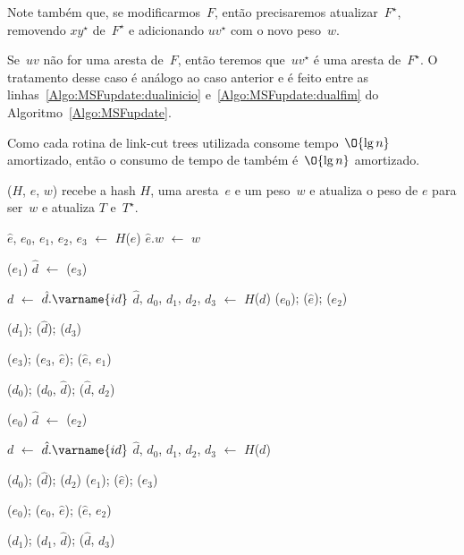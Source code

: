 Note também que, se modificarmos~$F$, então precisaremos atualizar~$F^\star$, removendo $xy^\star$ de~$F^\star$ e adicionando $uv^\star$ com o novo peso~$w$.

Se~$uv$ não for uma aresta de~$F$, então teremos que~$uv^\star$ é uma aresta de~$F^\star$.
O tratamento desse caso é análogo ao caso anterior e é feito entre as linhas~\ref{Algo:MSFupdate:dualinicio} e~\ref{Algo:MSFupdate:dualfim} do Algoritmo~\ref{Algo:MSFupdate}.

Como cada rotina de link-cut trees utilizada consome tempo~$\O{\lg n}$ amortizado, então o consumo de tempo de \MSFupdate{} também é~$\O{\lg n}$ amortizado.



\MSFupdate($H$, $e$, $w$) recebe a hash $H$, uma aresta~$e$ e um peso~$w$ e atualiza o peso de $e$ para ser~$w$ e atualiza $T$ e~$T^\star$.

\begin{algorithm}[htb]
\caption{\MSFupdate($H$, $e$, $w$)}
\label{Algo:MSFupdate}
\begin{algorithmic}[1]
\State $\hat e$, $e_0$, $e_1$, $e_2$, $e_3$ $\gets$ $H$($e$)
\State $\hat e.w$ $\gets$ $w$
\label{Algo:MSFupdate:linhauvinF}

\State \linkcutEvert($e_1$)
\State $\hat d$ $\gets$ \linkcutMin($e_3$)

\State \Return
\EndIf
\State $d$ $\gets$ $\hat d.\varname{id}$
\State $\hat d$, $d_0$, $d_1$, $d_2$, $d_3$ $\gets$ $H$($d$)
\State \linkcutEvert($e_0$); \linkcutDelEdge($\hat e$); \linkcutDelEdge($e_2$)

\State \linkcutEvert($d_1$); \linkcutDelEdge($\hat d$); \linkcutDelEdge($d_3$)

\State \linkcutEvert($e_3$); \linkcutAddEdge($e_3$, $\hat e$); \linkcutAddEdge($\hat e$, $e_1$)

\State \linkcutEvert($d_0$); \linkcutAddEdge($d_0$, $\hat d$); \linkcutAddEdge($\hat d$, $d_2$)
\EndIf

\Else

\State \linkcutEvert($e_0$)
\State $\hat d$ $\gets$ \linkcutMax($e_2$)

\State \Return
\EndIf
\State $d$ $\gets$ $\hat d.\varname{id}$
\State $\hat d$, $d_0$, $d_1$, $d_2$, $d_3$ $\gets$ $H$($d$)

\State \linkcutEvert($d_0$); \linkcutDelEdge($\hat d$); \linkcutDelEdge($d_2$)
\State \linkcutEvert($e_1$); \linkcutDelEdge($\hat e$); \linkcutDelEdge($e_3$)

\State \linkcutEvert($e_0$); \linkcutAddEdge($e_0$, $\hat e$); \linkcutAddEdge($\hat e$, $e_2$)

\State \linkcutEvert($d_1$); \linkcutAddEdge($d_1$, $\hat d$); \linkcutAddEdge($\hat d$, $d_3$)

\EndIf
\EndIf
\end{algorithmic}
\end{algorithm}
